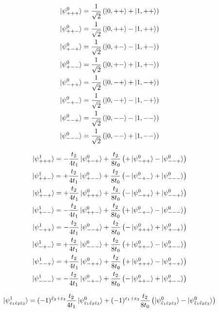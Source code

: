 \documentclass[11pt]{article}
\begin{document}
\begin{align}
	\ket{\psi^0_{+++}} = \frac{1}{\sqrt{2}}\left( \ket{0,++} + \ket{1,++} \right) \\
	\ket{\psi^0_{++-}} = \frac{1}{\sqrt{2}}\left( \ket{0,++} - \ket{1,++} \right) \\
	\ket{\psi^0_{+-+}} = \frac{1}{\sqrt{2}}\left( \ket{0,+-} - \ket{1,+-} \right) \\
	\ket{\psi^0_{+--}} = \frac{1}{\sqrt{2}}\left( \ket{0,+-} + \ket{1,+-} \right) \\
	\ket{\psi^0_{-++}} = \frac{1}{\sqrt{2}}\left( \ket{0,-+} + \ket{1,-+} \right) \\
	\ket{\psi^0_{-+-}} = \frac{1}{\sqrt{2}}\left( \ket{0,-+} - \ket{1,-+} \right) \\
	\ket{\psi^0_{--+}} = \frac{1}{\sqrt{2}}\left( \ket{0,--} - \ket{1,--} \right) \\
	\ket{\psi^0_{---}} = \frac{1}{\sqrt{2}}\left( \ket{0,--} + \ket{1,--} \right)
\end{align}

\begin{align}
	\ket{\psi^1_{+++}} = -\frac{t_2}{4 t_1} \ket{\psi^0_{+-+}} + \frac{t_2}{8 t_0}\left( +\ket{\psi^0_{-++}} - \ket{\psi^0_{--+}} \right) \\
	\ket{\psi^1_{++-}} = +\frac{t_2}{4 t_1} \ket{\psi^0_{+--}} + \frac{t_2}{8 t_0} \left( -\ket{\psi^0_{-+-}} + \ket{\psi^0_{---}} \right) \\
	\ket{\psi^1_{+-+}} = +\frac{t_2}{4 t_1} \ket{\psi^0_{+++}} +  \frac{t_2}{8 t_0} \left( -\ket{\psi^0_{-++}} + \ket{\psi^0_{--+}} \right) \\
	\ket{\psi^1_{+--}} = -\frac{t_2}{4 t_1} \ket{\psi^0_{++-}} +  \frac{t_2}{8 t_0} \left( +\ket{\psi^0_{-+-}} - \ket{\psi^0_{---}} \right) \\
	\ket{\psi^1_{-++}} = -\frac{t_2}{4 t_1} \ket{\psi^0_{--+}} + \frac{t_2}{8 t_0}\left( -\ket{\psi^0_{+++}} + \ket{\psi^0_{+-+}} \right) \\
	\ket{\psi^1_{-+-}} = +\frac{t_2}{4 t_1} \ket{\psi^0_{---}} + \frac{t_2}{8 t_0}\left( +\ket{\psi^0_{++-}} - \ket{\psi^0_{+--}} \right) \\
	\ket{\psi^1_{--+}} = +\frac{t_2}{4 t_1} \ket{\psi^0_{-++}} + \frac{t_2}{8 t_0}\left( +\ket{\psi^0_{+++}} - \ket{\psi^0_{+-+}} \right) \\
	\ket{\psi^1_{---}} = -\frac{t_2}{4 t_1} \ket{\psi^0_{-+-}} + \frac{t_2}{8 t_0}\left( -\ket{\psi^0_{++-}} + \ket{\psi^0_{+--}} \right)
\end{align}

\begin{equation}
	\ket{\psi^1_{\varepsilon_1 \varepsilon_2 \varepsilon_3}} = (-1)^{\bar{\varepsilon}_2 + \varepsilon_3} \frac{t_2}{4 t_1} \ket{\psi^0_{\varepsilon_1 \bar{\varepsilon}_2 \varepsilon_3}} + (-1)^{\varepsilon_1 + \varepsilon_3} \frac{t_2}{8 t_0} \left( \ket{\psi^0_{\bar{\varepsilon}_1 \varepsilon_2 \varepsilon_3}} - \ket{\psi^0_{\bar{\varepsilon}_1 \bar{\varepsilon}_2 \varepsilon_3}} \right)
\end{equation}
\end{document}
